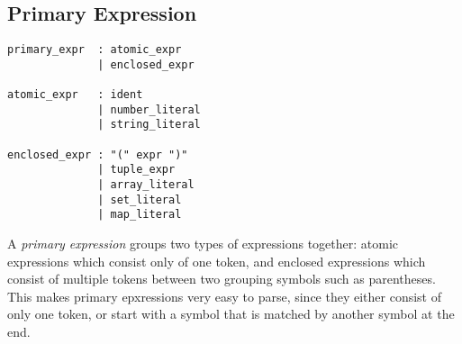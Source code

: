 \subsection{Primary Expression}

\begin{lstlisting}[language=EBNF]
primary_expr  : atomic_expr
              | enclosed_expr

atomic_expr   : ident
              | number_literal
              | string_literal

enclosed_expr : "(" expr ")"
              | tuple_expr
              | array_literal
              | set_literal
              | map_literal
\end{lstlisting}

A \emph{primary expression} groups two types of expressions together: atomic
expressions which consist only of one token, and enclosed expressions which
consist of multiple tokens between two grouping symbols such as parentheses.
This makes primary epxressions very easy to parse, since they either consist of
only one token, or start with a symbol that is matched by another symbol at the
end.

